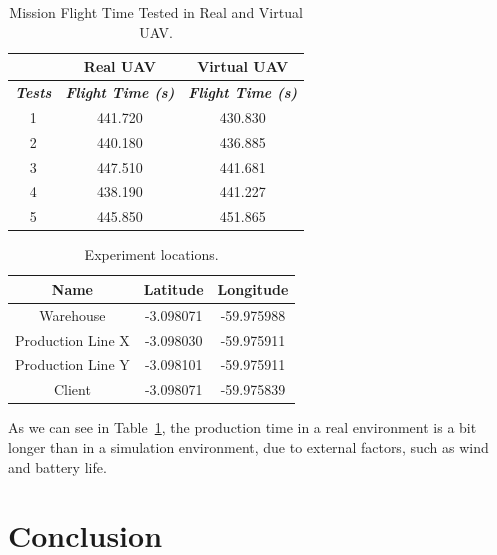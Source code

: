 \documentclass[12pt]{article}
\begin{document}
\begin{table}[H]
\centering
\caption{Mission Flight Time Tested in Real and Virtual UAV.}
\begin{tabular}{c|c|c|}
\cline{2-3}
\textbf{}                                     & \textbf{Real UAV}                 & \textbf{Virtual UAV}              \\ \hline
\multicolumn{1}{|c|}{\textit{\textbf{Tests}}} & \textit{\textbf{Flight Time (s)}} & \textit{\textbf{Flight Time (s)}} \\ \hline
\multicolumn{1}{|c|}{1}                       & 441.720                           & 430.830                           \\ \hline
\multicolumn{1}{|c|}{2}                       & 440.180                           & 436.885                           \\ \hline
\multicolumn{1}{|c|}{3}                       & 447.510                           & 441.681                           \\ \hline
\multicolumn{1}{|c|}{4}                       & 438.190                           & 441.227                           \\ \hline
\multicolumn{1}{|c|}{5}                       & 445.850                           & 451.865                           \\ \hline
\end{tabular}
\label{table:tests}
\end{table}

\begin{table}[H]
\centering
\begin{tabular}{|c|c|c|}
\hline
\bfseries Name & \bfseries Latitude & \bfseries Longitude \\
\hline
Warehouse & -3.098071 & -59.975988 \\
\hline
Production Line X & -3.098030 & -59.975911 \\
\hline
Production Line Y & -3.098101 & -59.975911 \\
\hline
Client & -3.098071 & -59.975839 \\
\hline
\end{tabular}
\caption{Experiment locations.}
\label{table:positions}
\end{table}

As we can see in Table~\ref{table:tests}, the production time in a real environment is a bit longer than in a simulation environment, due to external factors, such as wind and battery life.

\section{Conclusion}
\label{sec:conclusao}
\end{document}
